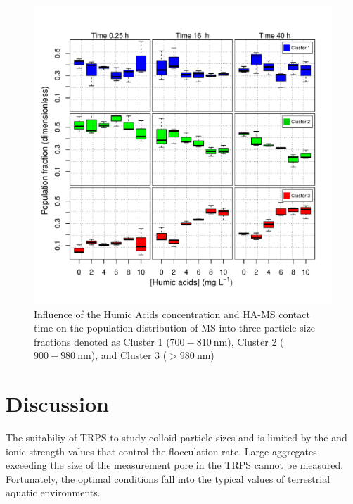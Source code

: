 \documentclass[journal=langd5,manuscript=article]{achemso}
\begin{document}
\begin{figure}
 \includegraphics[width=\linewidth]{Figures/Boxplot_MS_HA_CaCl2_populations.pdf}
  \caption{Influence of the Humic Acids concentration and HA-MS contact time on the population distribution of MS into three particle size fractions denoted as
  Cluster 1 ($700 - 810~\mathrm{nm}$),  Cluster 2 ($900 - 980~\mathrm{nm}$), 
  and
  Cluster 3 ($ > 980~\mathrm{nm}$)
  }
  \label{fgr:boxplot_populations}
\end{figure}






\section{Discussion}



The suitabiliy of TRPS to study colloid particle sizes
and is limited by the  and ionic strength  values that  control
the flocculation rate. Large aggregates exceeding  the size of the measurement pore in the TRPS cannot be measured.
Fortunately, the optimal conditions fall into the typical values of 
terrestrial aquatic environments.
\end{document}
